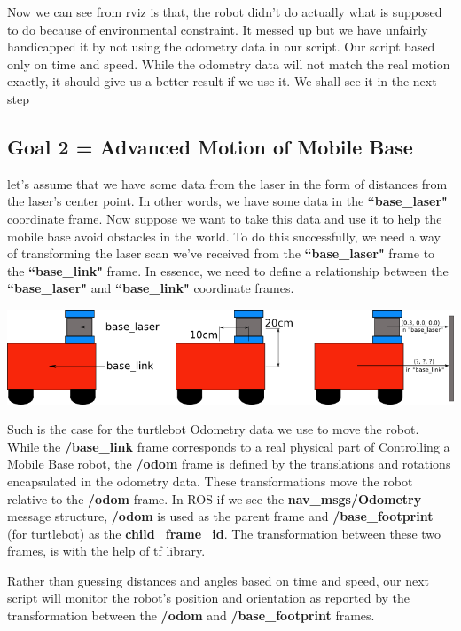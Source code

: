\documentclass[10pt,a4paper]{article}
\begin{document}
Now we can see from rviz is that, the robot didn't do actually what is supposed to do
because of environmental constraint. It messed up but we have unfairly handicapped it 
by not using the odometry data in our script. Our script based only on time and speed. 
While the odometry data will not match the real motion exactly, 
it should give us a better result if we use it. We shall see it in the next step

\subsection{Goal 2 = Advanced Motion of Mobile Base}
let's assume that we have some data from the laser in the form of distances from the laser's center point. In other words, we have some data in the \textbf{``base\_laser"} coordinate frame. Now suppose we want to take this data and use it to help the mobile base avoid obstacles in the world. To do this successfully, we need a way of transforming the laser scan we've received from the \textbf{``base\_laser"} frame to the \textbf{``base\_link"} frame. In essence, we need to define a relationship between the \textbf{``base\_laser"} and \textbf{``base\_link"} coordinate frames.\\

\begin{center}
\includegraphics[width=\textwidth]{images/simple_robot.png}\\
\end{center}

Such is the case for the turtlebot Odometry data we use to move the robot.
While the \textbf{/base\_link} frame corresponds to a real physical part of Controlling a Mobile Base robot, the \textbf{/odom} frame is defined by the translations and rotations encapsulated in the odometry data. These transformations move the robot relative to the \textbf{/odom} frame.
In ROS if we see the \textbf{nav\_msgs/Odometry} message structure, \textbf{/odom }is used as the parent frame and \textbf{/base\_footprint} (for turtlebot) as the \textbf{child\_frame\_id}. The transformation between these two frames, is with the help of tf library.

Rather than guessing distances and angles based on time and speed, our next script will monitor the robot's position and orientation as reported by the transformation between the \textbf{/odom }and \textbf{/base\_footprint} frames.
\end{document}
